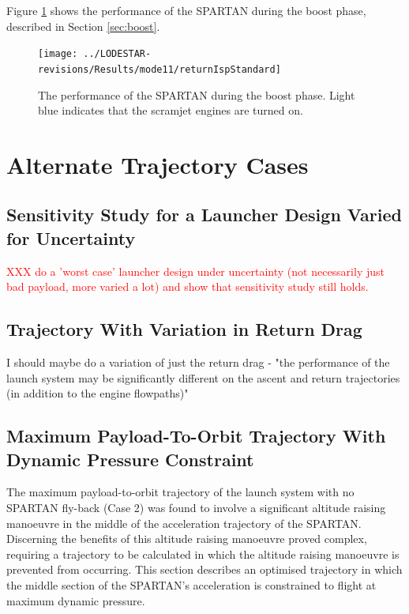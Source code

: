 Figure \ref{fig:returnIspStandard} shows the performance of the SPARTAN during the boost phase, described in Section \ref{sec:boost}. 

\begin{figure}[ht]
	\centering
	\texttt{[image: ../LODESTAR-revisions/Results/mode11/returnIspStandard]}
	\caption{The performance of the SPARTAN during the boost phase. Light blue indicates that the scramjet engines are turned on.}
	\label{fig:returnIspStandard}
\end{figure}


		\chapter{Alternate Trajectory Cases}
		
		\section{Sensitivity Study for a Launcher Design Varied for Uncertainty}
		\textcolor{red}{XXX do a 'worst case' launcher design under uncertainty (not necessarily just bad payload, more varied a lot) and show that sensitivity study still holds.}
		
		\section{Trajectory With Variation in Return Drag}
		I should maybe do a variation of just the return drag - "the performance of the launch system may be significantly different on the ascent and return trajectories (in addition to the engine flowpaths)"
		
		\section{Maximum Payload-To-Orbit Trajectory With Dynamic Pressure Constraint}\label{sec:Appendix_qconst}
	
		The maximum payload-to-orbit trajectory of the launch system with no SPARTAN fly-back (Case 2) was found to involve a significant altitude raising manoeuvre in the middle of the acceleration trajectory of the SPARTAN. Discerning the benefits of this altitude raising manoeuvre proved complex, requiring a trajectory to be calculated in which the altitude raising manoeuvre is prevented from occurring. This section describes an optimised trajectory in which the middle section of the SPARTAN's acceleration is constrained to flight at maximum dynamic pressure. 
		
